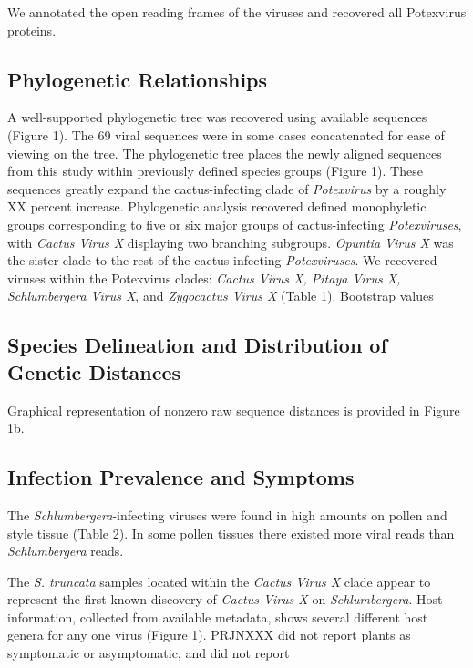 \documentclass[fleqn,10pt,lineno]{wlpeerj}
\begin{document}
We annotated the open reading frames of the viruses and recovered all Potexvirus proteins.

\subsection*{Phylogenetic Relationships}
A well-supported phylogenetic tree was recovered using available sequences (Figure 1).
The 69 viral sequences were in some cases concatenated for ease of viewing on the tree.
The phylogenetic tree places the newly aligned sequences from this study within previously defined species groups (Figure 1).
These sequences greatly expand the cactus-infecting clade of \textit{Potexvirus} by a roughly XX percent increase. 
Phylogenetic analysis recovered defined monophyletic groups corresponding to five or six major groups of cactus-infecting \textit{Potexviruses}, with \textit{Cactus Virus X} displaying two branching subgroups.
\textit{Opuntia Virus X} was the sister clade to the rest of the cactus-infecting \textit{Potexviruses}.
We recovered viruses within the Potexvirus clades: \textit{Cactus Virus X, Pitaya Virus X, Schlumbergera Virus X}, and \textit{Zygocactus Virus X} (Table 1).
Bootstrap values 

\subsection*{Species Delineation and Distribution of Genetic Distances}
Graphical representation of nonzero raw sequence distances is provided in Figure 1b. 

\subsection*{Infection Prevalence and Symptoms}
The \textit{Schlumbergera}-infecting viruses were found in high amounts on pollen and style tissue (Table 2).
In some pollen tissues there existed more viral reads than \textit{Schlumbergera} reads.

The \textit{S. truncata }samples located within the \textit{Cactus Virus X} clade appear to represent the first known discovery of \textit{Cactus Virus X} on \textit{Schlumbergera}.
Host information, collected from available metadata, shows several different host genera for any one virus (Figure 1).
PRJNXXX did not report plants as symptomatic or asymptomatic, and did not report 
 
\end{document}
